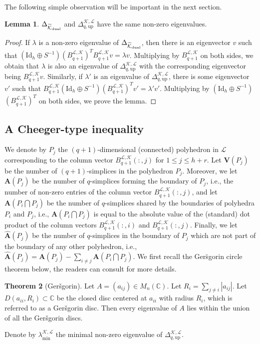 \documentclass{article}
\theoremstyle{definition}
\newtheorem{theorem}{Theorem}[section]
\newtheorem{lemma}[theorem]{Lemma}
\newcommand{\KK}{\mathcal{K}}
\newcommand{\LL}{\mathcal{L}}
\newcommand{\id}{\mathrm{Id}}
\begin{document}
The following simple observation will be important in the next section.


\begin{lemma}\label{lemma:same_eig_val}
$\Delta_{\widetilde{\KK}_{\textrm{\textrm{dual}}}}$ and $\Delta_{q, \mathrm{up}}^{\KK, \LL}$ have the same non-zero eigenvalues.
\end{lemma}

\begin{proof}
If $\lambda$ is a non-zero eigenvalue of $\Delta_{\widetilde{\KK}_{\textrm{\textrm{dual}}}}$,
then there is an eigenvector $v$ such that
$(\id_h\oplus S^{-1})(B_{q+1}^{\LL, \KK})^TB_{q+1}^{\LL, \KK}v=\lambda v$.
Multiplying by $B_{q+1}^{\LL, \KK}$ on both sides,
we obtain that $\lambda$ is also an eigenvalue of $\Delta_{q,\textrm{up}}^{\KK, \LL}$ with the corresponding eigenvector being 
$B_{q+1}^{\LL, \KK}v$.
Similarly,
if $\lambda'$ is an eigenvalue of $\Delta_{q,\textrm{up}}^{\KK, \LL}$,
there is some eigenvector $v'$ such that
$B_{q+1}^{\LL, \KK}\left(\id_h\oplus S^{-1}\right)(B_{q+1}^{\LL, \KK})^T v'=\lambda' v'$.
Multiplying by $(\id_h\oplus S^{-1})$
$\left(B_{q+1}^{\LL, \KK}\right)^T$ on both sides,
we prove the lemma.
\end{proof}


\subsection{A Cheeger-type inequality}\label{sec:cheeger}
We denote by $P_j$ the $(q+1)$-dimensional (connected) polyhedron in $\LL$ corresponding to the column vector $B_{q+1}^{\LL, \KK}(:, j)$ for $1\leq j\leq h+r$.
Let $\mathbf{V}(P_j)$ be the number of $(q+1)$-simplices in the polyhedron $P_j$.
Moreover,
we let $\mathbf{A}(P_j)$ be the number of $q$-simplices forming the boundary of $P_j$, i.e., the number of non-zero entries of the column vector $B_{q+1}^{\LL, \KK}(:, j)$,
and let $\mathbf{A}(P_i\bigcap P_j)$ be the number of $q$-simplices shared by the boundaries of polyhedra $P_{i}$ and $P_{j}$,
i.e.,
$\mathbf{A}(P_i\bigcap P_j)$ is equal to the absolute value of the (standard) dot product of the column vectors $B_{q+1}^{\LL, \KK}(:, i)$ and $B_{q+1}^{\LL, \KK}(:, j)$.
Finally,
we let $\widehat{\mathbf{A}}(P_j)$ be the number of $q$-simplices in the boundary of $P_j$ which are not part of the boundary of any other polyhedron,
i.e.,
$\widehat{\mathbf{A}}(P_j)
=
\mathbf{A}(P_j)
-
\sum\limits_{i\neq j}\mathbf{A}(P_i\bigcap P_j).
$
We first recall the Ger\u{s}gorin circle theorem below,
the readers can consult \cite{MR2978290, MR2093409} for more details.
\begin{theorem}[Geršgorin]\label{thm:gersgorin}
Let $A=(a_{ij})\in M_n(\mathbb{C})$. Let $R_i=\sum\limits_{j\neq i}|a_{ij}|$. Let $D(a_{ii}, R_i)\subset \mathbb{C}$ be the closed disc centered at $a_{ii}$ with radius $R_i$, which is referred to as a Geršgorin disc. Then every eigenvalue of $A$ lies within the union of all the Geršgorin discs.
\end{theorem}
Denote by $\lambda_{\mathrm{min}}^{\KK, \LL}$ the minimal non-zero eigenvalue of $\Delta_{q, \mathrm{up}}^{\KK, \LL}$.
\end{document}
